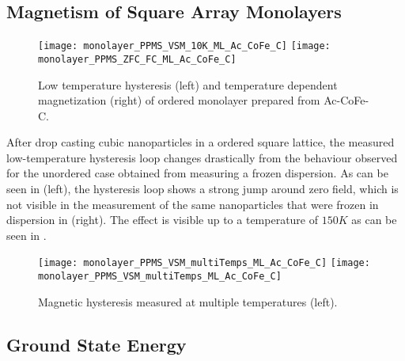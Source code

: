 \documentclass[\main/dresen_thesis.tex]{subfiles}
\renewcommand{\thisPath}{\main/chapters/monolayers/lateralStructure}
\begin{document}
  \subsection{Magnetism of Square Array Monolayers}
  \label{sec:monolayers:magneticStructure}
  \begin{figure}[tb]
    \centering
    \texttt{[image: monolayer\_PPMS\_VSM\_10K\_ML\_Ac\_CoFe\_C]}
    \texttt{[image: monolayer\_PPMS\_ZFC\_FC\_ML\_Ac\_CoFe\_C]}
    \caption{\label{fig:monolayer:magneticStructure:ppms}Low temperature hysteresis (left) and temperature dependent magnetization (right) of ordered monolayer prepared from Ac-CoFe-C.}
  \end{figure}
  After drop casting cubic nanoparticles in a ordered square lattice, the measured low-temperature hysteresis loop changes drastically from the behaviour observed for the unordered case obtained from measuring a frozen dispersion.
  As can be seen in  (left), the hysteresis loop shows a strong jump around zero field, which is not visible in the measurement of the same nanoparticles that were frozen in dispersion in  (right).
  The effect is visible up to a temperature of $150 \unit{K}$ as can be seen in .
  \begin{figure}[tb]
    \centering
    \texttt{[image: monolayer\_PPMS\_VSM\_multiTemps\_ML\_Ac\_CoFe\_C]}
    \texttt{[image: monolayer\_PPMS\_VSM\_multiTemps\_ML\_Ac\_CoFe\_C]}
    \caption{\label{fig:monolayer:magneticStructure:ppmsMultiT}Magnetic hysteresis measured at multiple temperatures (left).}
  \end{figure}
  

  \subsection{Ground State Energy}
    
    \FloatBarrier


\end{document}
